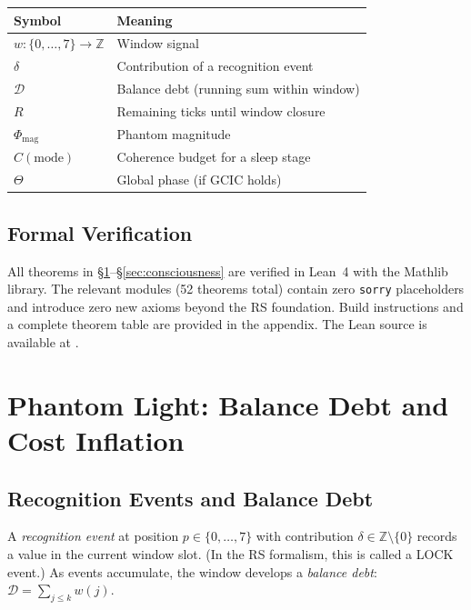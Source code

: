 \documentclass[11pt, a4paper]{article}
\theoremstyle{definition}
\theoremstyle{remark}
\begin{document}
\begin{center}
\begin{tabular}{ll}
\toprule
\textbf{Symbol} & \textbf{Meaning} \\
\midrule
$w : \{0,\ldots,7\} \to \mathbb{Z}$ & Window signal \\
$\delta$ & Contribution of a recognition event \\
$\mathcal{D}$ & Balance debt (running sum within window) \\
$R$ & Remaining ticks until window closure \\
$\Phi_{\mathrm{mag}}$ & Phantom magnitude \\
$C(\mathrm{mode})$ & Coherence budget for a sleep stage \\
$\Theta$ & Global phase (if GCIC holds) \\
\bottomrule
\end{tabular}
\end{center}

\subsection{Formal Verification}

All theorems in \S\ref{sec:phantom}--\S\ref{sec:consciousness} are
verified in Lean~4 with the Mathlib library. The relevant modules
(52 theorems total) contain zero \texttt{sorry} placeholders and
introduce zero new axioms beyond the RS foundation. Build
instructions and a complete theorem table are provided in the
appendix. The Lean source is available at \cite{RSLeanRepo}.


\section{Phantom Light: Balance Debt and Cost Inflation}
\label{sec:phantom}

\subsection{Recognition Events and Balance Debt}

A \emph{recognition event} at position $p \in \{0,\ldots,7\}$ with
contribution $\delta \in \mathbb{Z} \setminus \{0\}$ records a
value in the current window slot. (In the RS formalism, this is
called a LOCK event.) As events accumulate, the window develops a
\emph{balance debt}: $\mathcal{D} = \sum_{j \leq k} w(j)$.
\end{document}
